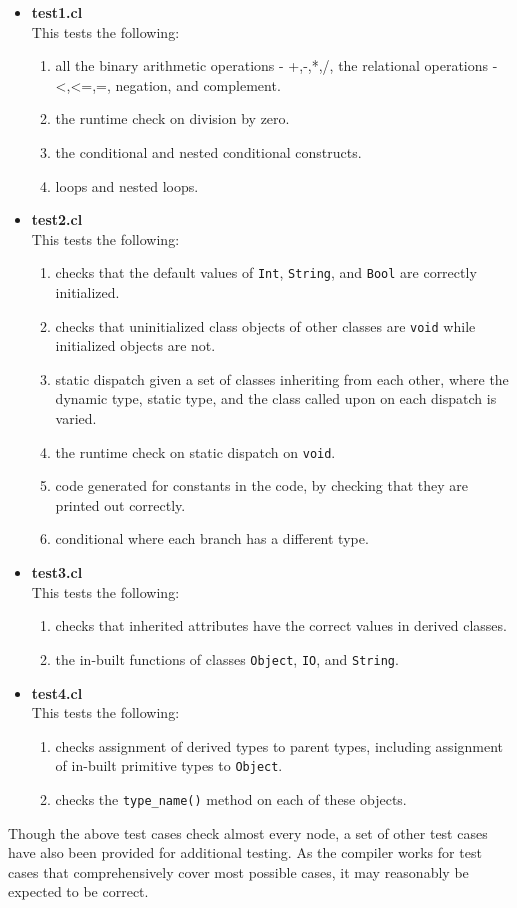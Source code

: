 \documentclass{article}
\begin{document}
\begin{itemize}
	\item \textbf{test1.cl} \\
	This tests the following:
	\begin{enumerate}
		\item all the binary arithmetic operations - +,-,*,/, the relational operations - <,<=,=, negation, and complement. 
		\item the runtime check on division by zero.
		\item the conditional and nested conditional constructs. 
		\item loops and nested loops.
	\end{enumerate}
	\item \textbf{test2.cl} \\
	This tests the following:
	\begin{enumerate}
		\item checks that the default values of \verb|Int|, \verb|String|, and \verb|Bool| are correctly initialized.
		\item checks that uninitialized class objects of other classes are \verb|void| while initialized objects are not.
		\item static dispatch given a set of classes inheriting from each other, where the dynamic type, static type, and the class called upon on each dispatch is varied.
		\item the runtime check on static dispatch on \verb|void|.
		\item code generated for constants in the code, by checking that they are printed out correctly.
		\item conditional where each branch has a different type.
	\end{enumerate}
	\item \textbf{test3.cl} \\
	This tests the following:
	\begin{enumerate}
		\item checks that inherited attributes have the correct values in derived classes.
		\item the in-built functions of classes \verb|Object|, \verb|IO|, and \verb|String|.
	\end{enumerate}
	\item \textbf{test4.cl} \\
	This tests the following:
	\begin{enumerate}
		\item checks assignment of derived types to parent types, including assignment of in-built primitive types to \verb|Object|.
		\item checks the \verb|type_name()| method on each of these objects.	
	\end{enumerate}
	
\end{itemize}
Though the above test cases check almost every node, a set of other test cases have also been provided for additional testing. As the compiler works for test cases that comprehensively cover most possible cases, it may reasonably be expected to be correct.
\end{document}
